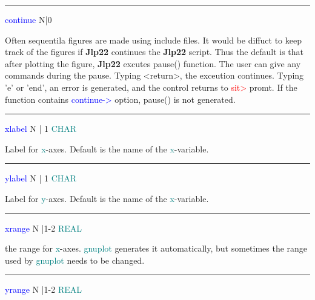 \vspace{0.3cm} 
\hrule 
\vspace{0.3cm} 
\noindent \textcolor{blue}{continue} \tabto{3cm} N|0  \tabto{5cm}    \tabto{7cm} 
\begin{changemargin}{3cm}{0cm} 
\noindent  Often sequentila figures are made using include files. It would be diffuct 
to keep track of the figures if \textbf{Jlp22} continues the \textbf{Jlp22} script. Thus the default is that 
after plotting the figure, \textbf{Jlp22} excutes \textcolor{VioletRed}{pause}() function. The user can 
give any commands during the pause. Typing <return>, the exceution continues. Typing 'e' or 'end', 
an error is generated, and the control returns to \textcolor{Red}{sit>} promt. If the function 
contains \textcolor{blue}{continue->} option, \textcolor{VioletRed}{pause}() is not generated. 
\end{changemargin} 
\vspace{0.3cm} 
\hrule 
\vspace{0.3cm} 
\noindent \textcolor{blue}{xlabel}  \tabto{3cm}  N | 1 \tabto{5cm}  \textcolor{teal}{CHAR}  \tabto{7cm} 
\begin{changemargin}{3cm}{0cm} 
\noindent  Label for \textcolor{teal}{x}-axes. Default is the name of the \textcolor{teal}{x}-variable. 
\end{changemargin} 
\vspace{0.3cm} 
\hrule 
\vspace{0.3cm} 
\noindent \textcolor{blue}{ylabel}  \tabto{3cm}  N | 1 \tabto{5cm}  \textcolor{teal}{CHAR}  \tabto{7cm} 
\begin{changemargin}{3cm}{0cm} 
\noindent  Label for \textcolor{teal}{y}-axes. Default is the name of the \textcolor{teal}{x}-variable. 
\end{changemargin} 
\vspace{0.3cm} 
\hrule 
\vspace{0.3cm} 
\noindent \textcolor{blue}{xrange}  \tabto{3cm}  N |1-2 \tabto{5cm}   \textcolor{teal}{REAL} \tabto{7cm} 
\begin{changemargin}{3cm}{0cm} 
\noindent the range for \textcolor{teal}{x}-axes. \textcolor{teal}{gnuplot} generates it automatically, but 
sometimes the range used by \textcolor{teal}{gnuplot} needs to be changed. 
\end{changemargin} 
\vspace{0.3cm} 
\hrule 
\vspace{0.3cm} 
\noindent \textcolor{blue}{yrange}  \tabto{3cm}  N |1-2 \tabto{5cm}  \textcolor{teal}{REAL} \tabto{7cm} 
